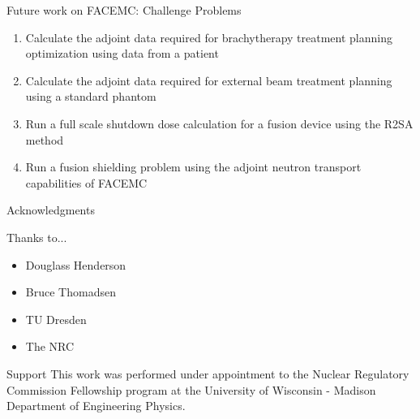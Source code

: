 \documentclass{beamer}
\begin{document}
\begin{frame}{Future work on FACEMC: Challenge Problems}
  
    \begin{enumerate}
      \item Calculate the adjoint data required for brachytherapy treatment 
        planning optimization using data from a patient
        \bigskip
      \item Calculate the adjoint data required for external beam treatment 
        planning using a standard phantom
        \bigskip
      \item Run a full scale shutdown dose calculation for a fusion device using
        the R2SA method
        \bigskip
      \item Run a fusion shielding problem using the adjoint neutron transport 
        capabilities of FACEMC
    \end{enumerate}
  
\end{frame}

\begin{frame}{Acknowledgments}

  Thanks to...
  
  \begin{itemize}
    \item Douglass Henderson
    \item Bruce Thomadsen
    \item TU Dresden
    \item The NRC
  \end{itemize}

  \medskip \medskip \medskip \medskip \medskip \medskip \medskip

  \begin{beamerboxesrounded}[upper=boxheadcolor,lower=boxbodycolor,shadow=true]{Support}
    This work was performed under appointment to the Nuclear Regulatory
    Commission Fellowship program at the University of Wisconsin - Madison
    Department of Engineering Physics.
  \end{beamerboxesrounded}

\end{frame}

\end{document}
